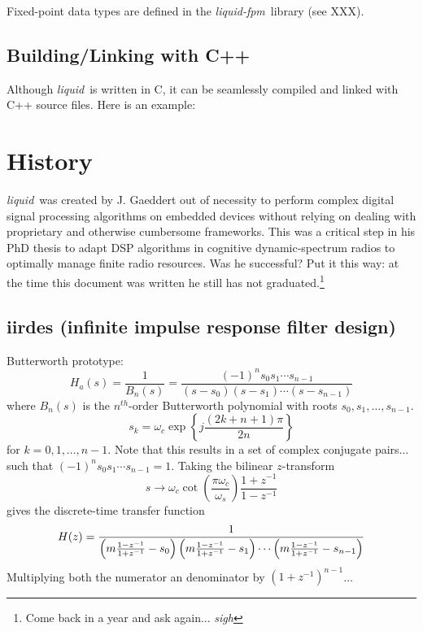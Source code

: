 \documentclass[11pt,twoside]{report}
\newcommand{\liquid}{{\it liquid}}
\newcommand{\liquidfpm}{{\it liquid-fpm}}
\begin{document}
Fixed-point data types are defined in the \liquidfpm\ library (see XXX).

\subsection{Building/Linking with C++}
Although \liquid\ is written in C, it can be seamlessly compiled and linked
with C++ source files.
Here is an example:


\section{History}
\liquid\ was created by J. Gaeddert out of necessity to perform complex
digital signal processing algorithms on embedded devices
without relying on dealing
with proprietary and otherwise cumbersome frameworks.
This was a critical step in his PhD thesis to adapt DSP algorithms in
cognitive dynamic-spectrum radios to optimally manage finite radio resources.
Was he successful?
Put it this way: at the time this document was written he still has not
graduated.\footnote{Come back in a year and ask again... {\em sigh}}

\subsection{iirdes (infinite impulse response filter design)}
Butterworth prototype:
\[
    H_a(s) = \frac{1}{B_n(s)}
           = \frac{
                (-1)^n s_0 s_1 \cdots s_{n-1}
            }{
                (s-s_0)(s-s_1) \cdots (s-s_{n-1})
            }
\]
where $B_n(s)$ is the $n^{th}$-order Butterworth polynomial with roots
$s_0,s_1,\ldots,s_{n-1}$.
\[
    s_k = \omega_c \exp\left\{
                j \frac{\left(2k+n+1\right)\pi}{2n}
          \right\}
\]
for $k=0,1,\ldots,n-1$.
Note that this results in a set of complex conjugate pairs... such that
$(-1)^n s_0 s_1 \cdots s_{n-1} = 1$.
Taking the bilinear $z$-transform
\[
    s \rightarrow \omega_c
                  \cot\left(\frac{\pi \omega_c}{\omega_s}\right)
                  \frac{1+z^{-1}}{1-z^{-1}}
\]
gives the discrete-time transfer function
\[
    H(z) = \frac{
            1
           }{
            \left(m\frac{1-z^{-1}}{1+z^{-1}}-s_0\right)
            \left(m\frac{1-z^{-1}}{1+z^{-1}}-s_1\right)
            \cdots
            \left(m\frac{1-z^{-1}}{1+z^{-1}}-s_{n-1}\right)
           }
\]
Multiplying both the numerator an denominator by $(1+z^{-1})^{n-1}$...
\end{document}
